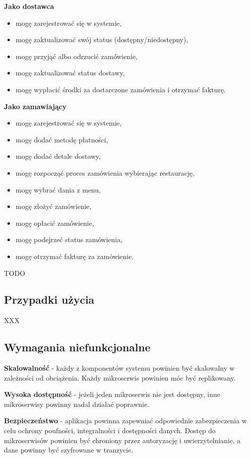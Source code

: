 \textbf{Jako dostawca}
\begin{itemize}
    \item mogę zarejestrować się w systemie,
    \item mogę zaktualizować swój status (dostępny/niedostępny),
    \item mogę przyjąć albo odrzucić zamówienie,
    \item mogę zaktualizować status dostawy,
    \item mogę wypłacić środki za dostarczone zamówienia i otrzymać fakturę.
\end{itemize}

\textbf{Jako zamawiający}
\begin{itemize}
    \item mogę zarejestrować się w systemie,
    \item mogę dodać metodę płatności,
    \item mogę dodać detale dostawy,
    \item mogę rozpocząć proces zamówienia wybierając restaurację,
    \item mogę wybrać dania z menu,
    \item mogę złożyć zamówienie,
    \item mogę opłacić zamówienie,
    \item mogę podejrzeć status zamówienia,
    \item mogę otrzymać fakturę za zamówienie.
\end{itemize}

TODO

\subsection{Przypadki użycia}

XXX

\subsection{Wymagania niefunkcjonalne}

\textbf{Skalowalność} - każdy z komponentów systemu powinien być skalowalny w zależności od obciążenia. Każdy mikroserwis powinien móc być replikowany.

\textbf{Wysoka dostępność} - jeżeli jeden mikroserwis nie jest dostępny, inne mikroserwisy powinny nadal działać poprawnie.

\textbf{Bezpieczeństwo} - aplikacja powinna zapewniać odpowiednie zabezpieczenia w celu ochrony poufności, integralności i dostępności danych. Dostęp do mikroserwisów powinien być chroniony przez autoryzację i uwierzytelnianie, a dane powinny być szyfrowane w tranzycie.

